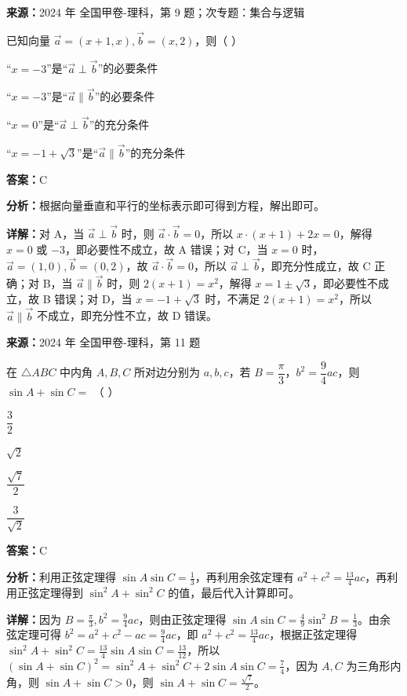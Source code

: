 \begin{question}[points=5]
\textbf{来源：}2024 年 全国甲卷-理科，第 9 题；次专题：集合与逻辑\par
已知向量 $\vec{a}=(x+1,x),\vec{b}=(x,2)$，则（   ）
\begin{choices}
  \item “$x=-3$”是“$\vec{a}\perp\vec{b}$”的必要条件
  \item “$x=-3$”是“$\vec{a}\parallel\vec{b}$”的必要条件
  \item “$x=0$”是“$\vec{a}\perp\vec{b}$”的充分条件
  \item “$x=-1+\sqrt{3}$”是“$\vec{a}\parallel\vec{b}$”的充分条件
\end{choices}
\begin{solution}
\textbf{答案：}C

\textbf{分析：}根据向量垂直和平行的坐标表示即可得到方程，解出即可。

\textbf{详解：}对 A，当 $\vec{a}\perp\vec{b}$ 时，则 $\vec{a}\cdot\vec{b}=0$，所以 $x\cdot(x+1)+2x=0$，解得 $x=0$ 或 $-3$，即必要性不成立，故 A 错误；对 C，当 $x=0$ 时，$\vec{a}=(1,0),\vec{b}=(0,2)$，故 $\vec{a}\cdot\vec{b}=0$，所以 $\vec{a}\perp\vec{b}$，即充分性成立，故 C 正确；对 B，当 $\vec{a}\parallel\vec{b}$ 时，则 $2(x+1)=x^2$，解得 $x=1\pm\sqrt{3}$，即必要性不成立，故 B 错误；对 D，当 $x=-1+\sqrt{3}$ 时，不满足 $2(x+1)=x^2$，所以 $\vec{a}\parallel\vec{b}$ 不成立，即充分性不立，故 D 错误。
\end{solution}
\end{question}

\begin{question}[points=5]
\textbf{来源：}2024 年 全国甲卷-理科，第 11 题\par
在 $\triangle ABC$ 中内角 $A,B,C$ 所对边分别为 $a,b,c$，若 $B=\dfrac{\pi}{3}$，$b^2=\dfrac{9}{4}ac$，则 $\sin A+\sin C=$ （   ）
\begin{choices}
  \item $\dfrac{3}{2}$
  \item $\sqrt{2}$
  \item $\dfrac{\sqrt{7}}{2}$
  \item $\dfrac{3}{\sqrt{2}}$
\end{choices}
\begin{solution}
\textbf{答案：}C

\textbf{分析：}利用正弦定理得 $\sin A\sin C=\frac{1}{3}$，再利用余弦定理有 $a^2+c^2=\frac{13}{4}ac$，再利用正弦定理得到 $\sin^2 A+\sin^2 C$ 的值，最后代入计算即可。

\textbf{详解：}因为 $B=\frac{\pi}{3},b^2=\frac{9}{4}ac$，则由正弦定理得 $\sin A\sin C=\frac{4}{9}\sin^2 B=\frac{1}{3}$。由余弦定理可得 $b^2=a^2+c^2-ac=\frac{9}{4}ac$，即 $a^2+c^2=\frac{13}{4}ac$，根据正弦定理得 $\sin^2 A+\sin^2 C=\frac{13}{4}\sin A\sin C=\frac{13}{12}$，所以 $(\sin A+\sin C)^2=\sin^2 A+\sin^2 C+2\sin A\sin C=\frac{7}{4}$，因为 $A,C$ 为三角形内角，则 $\sin A+\sin C>0$，则 $\sin A+\sin C=\frac{\sqrt{7}}{2}$。
\end{solution}
\end{question}


